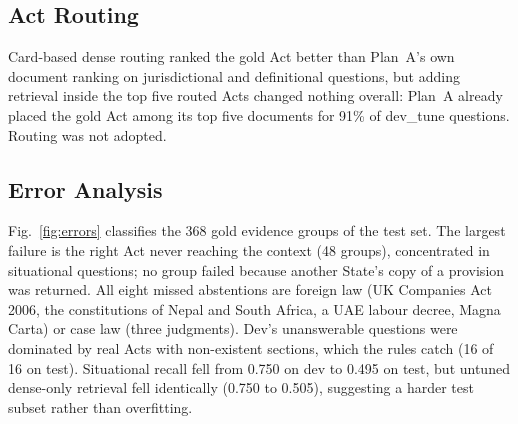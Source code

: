 \documentclass[conference]{IEEEtran}
\begin{document}
\subsection{Act Routing}

Card-based dense routing ranked the gold Act better than Plan~A's own document ranking on jurisdictional and
definitional questions, but adding retrieval inside the top five routed Acts changed nothing overall: Plan~A
already placed the gold Act among its top five documents for 91\% of dev\_tune questions. Routing was not adopted.

\subsection{Error Analysis}

Fig.~\ref{fig:errors} classifies the 368 gold evidence groups of the test set. The largest failure is the right Act
never reaching the context (48 groups), concentrated in situational questions; no group failed because another
State's copy of a provision was returned. All eight missed abstentions are foreign law (UK Companies Act 2006,
the constitutions of Nepal and South Africa, a UAE labour decree, Magna Carta) or case law (three judgments). Dev's
unanswerable questions were dominated by real Acts with non-existent sections, which the rules catch (16 of 16 on
test). Situational recall fell from 0.750 on dev to 0.495 on test, but untuned dense-only retrieval fell
identically (0.750 to 0.505), suggesting a harder test subset rather than overfitting.
\end{document}
